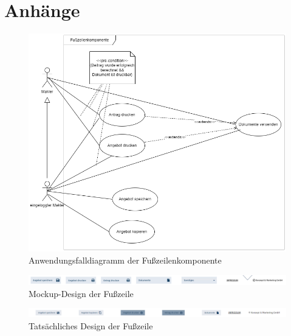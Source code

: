 \appendix

\section{Anhänge}

\begin{figure}[!htbp]
	\includegraphics[width=\textwidth, height=\textheight, keepaspectratio]{anhang/usecase_footer.png}
	\caption{Anwendungsfalldiagramm der Fußzeilenkomponente}
	\label{usecasefooter}
\end{figure}
\begin{figure}[!htbp]
	\includegraphics[width=\textwidth, height=\textheight, keepaspectratio]{anhang/mockup_footer.png}
	\caption{Mockup-Design der Fußzeile}
	\label{mockup}
\end{figure}
\begin{figure}[!htbp]
	\includegraphics[width=\textwidth, height=\textheight, keepaspectratio]{anhang/actual_footer.png}
	\caption{Tatsächliches Design der Fußzeile}
	\label{actualfooter}
\end{figure}
